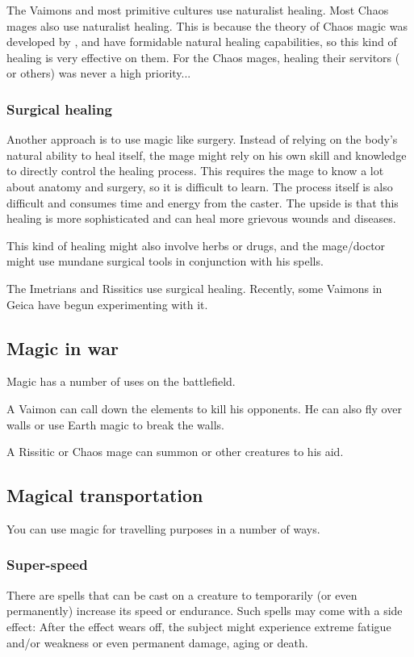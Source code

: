 The Vaimons and most primitive cultures use naturalist healing. Most Chaos mages also use naturalist healing. This is because the theory of Chaos magic was developed by \dragons{}, and \dragons{} have formidable natural healing capabilities, so this kind of healing is very effective on them. For the \draconic{} Chaos mages, healing their servitors (\scathae{} or others) was never a high priority...

\subsubsection{Surgical healing}
Another approach is to use magic like surgery. Instead of relying on the body's natural ability to heal itself, the mage might rely on his own skill and knowledge to directly control the healing process. This requires the mage to know a lot about anatomy and surgery, so it is difficult to learn. The process itself is also difficult and consumes time and energy from the caster. The upside is that this healing is more sophisticated and can heal more grievous wounds and diseases. 

This kind of healing might also involve herbs or drugs, and the mage/doctor might use mundane surgical tools in conjunction with his spells. 

The Imetrians and Rissitics use surgical healing. Recently, some Vaimons in Geica have begun experimenting with it. 

\subsection{Magic in war}
Magic has a number of uses on the battlefield. 

A Vaimon can call down the elements to kill his opponents. He can also fly over walls or use Earth magic to break the walls. 

A Rissitic or Chaos mage can summon \daemons{} or other creatures to his aid. 

\subsection{Magical transportation}
You can use magic for travelling purposes in a number of ways. 

\subsubsection{Super-speed}
There are spells that can be cast on a creature to temporarily (or even permanently) increase its speed or endurance. Such spells may come with a side effect: After the effect wears off, the subject might experience extreme fatigue and/or weakness or even permanent damage, aging or death. 

